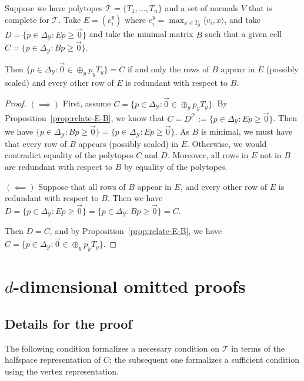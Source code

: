 \documentclass[anon]{colt2020} %
\newcommand{\Comments}{1}
\newcommand{\mytodo}[2]{\ifnum\Comments=1%
	\todo[linecolor=#1!80!black,backgroundcolor=#1,bordercolor=#1!80!black]{#2}\fi}
\newcommand{\btw}[1]{\mytodo{orange!20!white}{BTW: #1}}
\newcommand{\simplex}{\Delta_\Y}
\newcommand{\T}{\mathcal{T}}
\newcommand{\Y}{\mathcal{Y}}
\newcommand{\inprod}[2]{\langle #1, #2 \rangle}%
\begin{document}
\begin{proposition}\label{prop:relate-rows}
	Suppose we have polytopes $\T = \{T_1, \ldots, T_n\}$ and a set of normals $V$ that is complete for $\T$.
	Take $E = (e_{i}^y)$ where $e_{i}^y = \max_{x \in T_y} \inprod{v_i}{x}$, and take $D = \{p \in \simplex : Ep \geq \vec 0\}$ and take the minimal matrix $B$ such that a given cell $C = \{p \in \simplex : Bp \geq \vec 0\}$.
	
	Then $\{p \in \simplex : \vec 0 \in \oplus_y p_y T_y\} = C$	if and only the rows of $B$ appear in $E$ (possibly scaled) and every other row of $E$ is redundant with respect to $B$.
\end{proposition}
\begin{proof}
		$(\implies)$ First, assume $C = \{p \in \simplex: \vec 0 \in \oplus_y p_y T_y\}$.
		By Proposition~\ref{prop:relate-E-B}, we know that $C = D^\T := \{p \in \simplex : Ep \geq \vec 0\}$.
		Then we have $\{p \in \simplex : Bp \geq \vec 0\} = \{p \in \simplex : Ep \geq \vec 0\}$.
		As $B$ is minimal, we must have that every row of $B$ appears (possibly scaled) in $E$.
		Otherwise, we would contradict equality of the polytopes $C$ and $D$.
		Moreover, all rows in $E$ not in $B$ are redundant with respect to $B$ by equality of the polytopes.
		
		$(\impliedby)$ Suppose that all rows of $B$ appear in $E$, and every other row of $E$ is redundant with respect to $B$.
		Then we have $D = \{p\in \simplex : Ep \geq \vec 0\} = \{p \in \simplex : Bp \geq \vec 0\} = C$.
		
		Then $D = C$, and by Proposition~\ref{prop:relate-E-B}, we have $C = \{p \in \simplex : \vec 0 \in \oplus_y p_y T_y\}$.
\end{proof}


\section{$d$-dimensional omitted proofs}\label{app:omitted-d-dim}

\subsection{Details for the proof}

The following condition formalizes a necessary condition on $\T$ in terms of the halfspace representation of $C$; the subsequent one formalizes a sufficient condition using the vertex representation.
\end{document}

